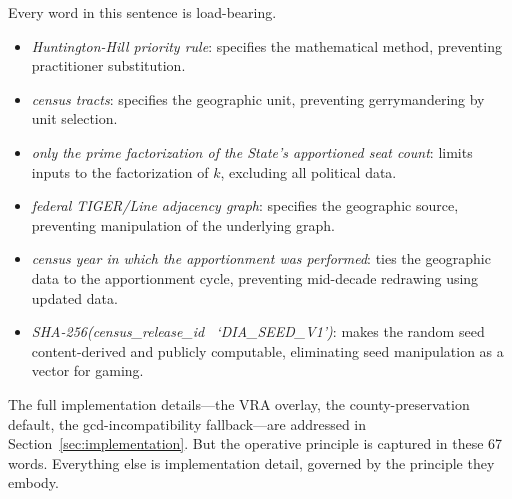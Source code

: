 Every word in this sentence is load-bearing.

\begin{itemize}
  \item \textit{Huntington-Hill priority rule}: specifies the mathematical
    method, preventing practitioner substitution.
  \item \textit{census tracts}: specifies the geographic unit, preventing
    gerrymandering by unit selection.
  \item \textit{only the prime factorization of the State's apportioned
    seat count}: limits inputs to the factorization of $k$, excluding
    all political data.
  \item \textit{federal TIGER/Line adjacency graph}: specifies the
    geographic source, preventing manipulation of the underlying graph.
  \item \textit{census year in which the apportionment was performed}:
    ties the geographic data to the apportionment cycle, preventing
    mid-decade redrawing using updated data.
  \item \textit{SHA-256(census\_release\_id \textbar\textbar\
    `DIA\_SEED\_V1')}: makes the random seed content-derived and publicly
    computable, eliminating seed manipulation as a vector for gaming.
\end{itemize}

The full implementation details---the VRA overlay, the county-preservation
default, the gcd-incompatibility fallback---are addressed in
Section~\ref{sec:implementation}.
But the operative principle is captured in these 67 words.
Everything else is implementation detail, governed by the principle they embody.
